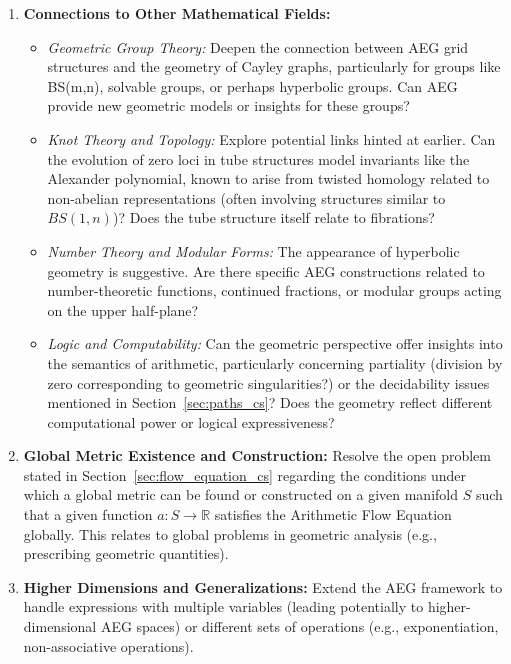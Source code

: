 \documentclass[12pt]{article}
\begin{document}
\begin{enumerate}[label=\textbf{F\arabic*.}, leftmargin=*, widest=F6, align=left]
    \item \textbf{Connections to Other Mathematical Fields:}
        \begin{itemize}
            \item \textit{Geometric Group Theory:} Deepen the connection between AEG grid structures and the geometry of Cayley graphs, particularly for groups like BS(m,n), solvable groups, or perhaps hyperbolic groups. Can AEG provide new geometric models or insights for these groups?
            \item \textit{Knot Theory and Topology:} Explore potential links hinted at earlier. Can the evolution of zero loci in tube structures model invariants like the Alexander polynomial, known to arise from twisted homology related to non-abelian representations (often involving structures similar to \( BS(1, n) \))? Does the tube structure itself relate to fibrations?
            \item \textit{Number Theory and Modular Forms:} The appearance of hyperbolic geometry is suggestive. Are there specific AEG constructions related to number-theoretic functions, continued fractions, or modular groups acting on the upper half-plane?
            \item \textit{Logic and Computability:} Can the geometric perspective offer insights into the semantics of arithmetic, particularly concerning partiality (division by zero corresponding to geometric singularities?) or the decidability issues mentioned in Section~\ref{sec:paths_cs}? Does the geometry reflect different computational power or logical expressiveness?
        \end{itemize}

    \item \textbf{Global Metric Existence and Construction:} Resolve the open problem stated in Section~\ref{sec:flow_equation_cs} regarding the conditions under which a global metric can be found or constructed on a given manifold \( S \) such that a given function \( a: S \to \mathbb{R} \) satisfies the Arithmetic Flow Equation globally. This relates to global problems in geometric analysis (e.g., prescribing geometric quantities).

    \item \textbf{Higher Dimensions and Generalizations:} Extend the AEG framework to handle expressions with multiple variables (leading potentially to higher-dimensional AEG spaces) or different sets of operations (e.g., exponentiation, non-associative operations).
\end{enumerate}
\end{document}
